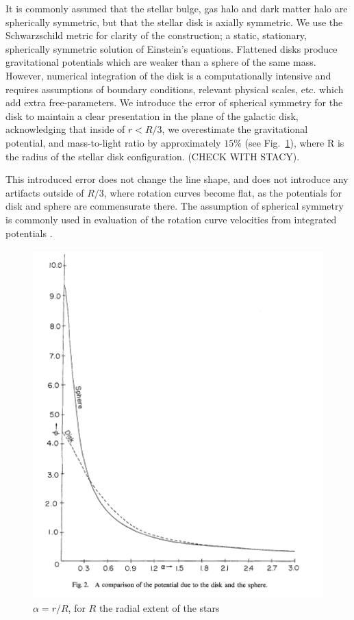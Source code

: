 \documentclass[reprint,%
 amsmath,amssymb,
 aps,
]{revtex4-1}
\begin{document}
It is commonly assumed that   the stellar bulge, gas halo and   dark matter halo are spherically symmetric, but that the stellar disk is axially symmetric. We use 
the Schwarzschild metric   for clarity of the construction;  a static, stationary, spherically symmetric solution of Einstein's equations.
Flattened disks produce gravitational potentials which are weaker than a sphere of the same mass\cite{Chatterjee}. However, numerical integration of the disk is a computationally intensive and requires assumptions of  boundary conditions,   relevant physical scales,  etc. which add extra free-parameters\cite{2011A&A...531A..36H}. We 
  introduce the error of spherical symmetry   for the disk to maintain a clear presentation in the plane of the galactic disk, acknowledging  that inside of $r< R/3$, we   overestimate the gravitational potential, and  mass-to-light ratio by approximately $15\%$ (see Fig.~\ref{fig:my_geom}),  where R is the radius of the stellar disk configuration.  (CHECK WITH STACY). 


This introduced error does not change  the line shape, and   does not introduce any artifacts outside of $R/3$, where rotation curves become flat,  as the potentials for disk and sphere are commensurate there. The assumption of spherical symmetry is commonly used   in evaluation of the   rotation curve velocities from integrated potentials \cite{2022A&A...664A..40M,PhysRevD.70.083509}. 
 
\begin{figure}
    \centering
     \includegraphics[width=\linewidth]{Chatterjee_SphereDisk.png}
    \caption{ $\alpha = r/R$, for $R$ the radial extent of the stars \cite{Chatterjee}}
    \label{fig:my_geom}
\end{figure}
\end{document}
